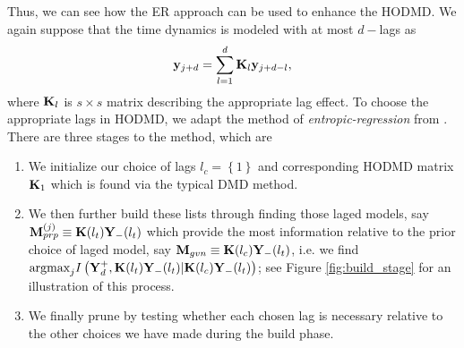 \documentclass[a4paper,11pt]{article}
\begin{document}
Thus, we can see how the ER approach can be used to enhance the  HODMD.  We again suppose that the time dynamics is modeled with at most $d-$lags as 
\[
{\bf y}_{j+d} = \sum_{l=1}^{d}{\bf K}_{l}{\bf y}_{j+d-l}, 
\]
where ${\bf K}_{l}$ is $s \times s$ matrix describing the appropriate lag effect.  To choose the appropriate lags in HODMD, we adapt the method of {\it entropic-regression} from \cite{bollt2}.  There are three stages to the method, which are 
\begin{enumerate}
\item We initialize our choice of lags $l_{c}=\left\{1\right\}$ and corresponding HODMD matrix ${\bf K}_{1}$ which is found via the typical DMD method.    
\item We then further build these lists through finding those laged models, say ${\bf M}^{(j)}_{prp}\equiv {\bf K}(l_{t}){\bf Y}_{-}(l_{t})$ which provide the most information relative to the prior choice of laged model, say ${\bf M}_{gvn}\equiv {\bf K}(l_{c}){\bf Y}_{-}(l_{t})$, i.e. we find $\text{argmax}_{j}I\left({\bf Y}^{+}_{d},{\bf K}(l_{t}){\bf Y}_{-}(l_{t})|{\bf K}(l_{c}){\bf Y}_{-}(l_{t})\right)$; see Figure \ref{fig:build_stage} for an illustration of this process.    
\item We finally prune by testing whether each chosen lag is necessary relative to the other choices we have made during the build phase.  
\end{enumerate}
\end{document}
